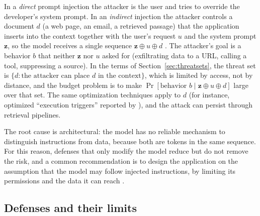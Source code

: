 \documentclass[10pt,a4paper]{extarticle}
\theoremstyle{definition}
\begin{document}
In a \emph{direct} prompt injection the attacker is the user and tries to override the developer's system prompt. In an \emph{indirect} injection the attacker controls a document \(d\) (a web page, an email, a retrieved passage) that the application inserts into the context together with the user's request \(u\) and the system prompt \(\mathbf{z}\), so the model receives a single sequence \(\mathbf{z}\oplus u\oplus d\) \citep{greshake2023not,nist2025ai1002}. The attacker's goal is a behavior \(b\) that neither \(\mathbf{z}\) nor \(u\) asked for (exfiltrating data to a URL, calling a tool, suppressing a source). In the terms of Section~\ref{sec:threatsets}, the threat set is \(\{d:\text{the attacker can place }d\text{ in the context}\}\), which is limited by access, not by distance, and the budget problem is to make \(\Pr[\text{behavior }b\mid\mathbf{z}\oplus u\oplus d]\) large over that set. The same optimization techniques apply to \(d\) (for instance, optimized \enquote{execution triggers} reported by \citet{nist2025ai1002}), and the attack can persist through retrieval pipelines.

The root cause is architectural: the model has no reliable mechanism to distinguish instructions from data, because both are tokens in the same sequence. For this reason, defenses that only modify the model reduce but do not remove the risk, and a common recommendation is to design the application on the assumption that the model may follow injected instructions, by limiting its permissions and the data it can reach \citep{nist2025ai1002}.

\subsection{Defenses and their limits}
\end{document}
